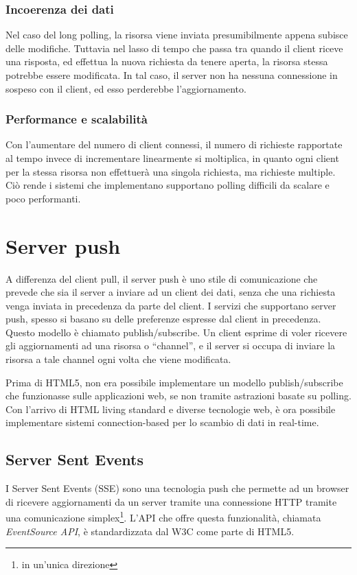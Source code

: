 \documentclass[12pt,a4paper,openright,twoside]{report}
\begin{document}
\subsubsection{Incoerenza dei dati}
Nel caso del long polling, la risorsa viene inviata presumibilmente appena subisce delle modifiche. Tuttavia nel lasso di tempo che passa tra quando il client riceve una risposta, ed effettua la nuova richiesta da tenere aperta, la risorsa stessa potrebbe essere modificata. In tal caso, il server non ha nessuna connessione in sospeso con il client, ed esso perderebbe l’aggiornamento. 

\subsubsection{Performance e scalabilità}
Con l’aumentare del numero di client connessi, il numero di richieste rapportate al tempo invece di incrementare linearmente si moltiplica, in quanto ogni client per la stessa risorsa non effettuerà una singola richiesta, ma richieste multiple. Ciò rende i sistemi che implementano supportano polling difficili da scalare e poco performanti.

\section{Server push}\label{sec_serverpush}
A differenza del client pull, il server push è uno stile di comunicazione che prevede che sia il server a inviare ad un client dei dati, senza che una richiesta venga inviata in precedenza da parte del client. I servizi che supportano server push, spesso si basano su delle preferenze espresse dal client in precedenza. Questo modello è chiamato publish/subscribe. Un client esprime di voler ricevere gli aggiornamenti ad una risorsa o “channel”, e il server si occupa di inviare la risorsa a tale channel ogni volta che viene modificata.

\bigskip

Prima di HTML5, non era possibile implementare un modello publish/subscribe che funzionasse sulle applicazioni web, se non tramite astrazioni basate su polling. Con l’arrivo di HTML living standard e diverse tecnologie web, è ora possibile implementare sistemi connection-based per lo scambio di dati in real-time.

\subsection{Server Sent Events}
I Server Sent Events (SSE) sono una tecnologia push che permette ad un browser di ricevere aggiornamenti da un server tramite una connessione HTTP tramite una comunicazione simplex\footnote{in un'unica direzione}. L'API che offre questa funzionalità, chiamata \textit{EventSource API}, è standardizzata dal W3C come parte di HTML5.
\end{document}

